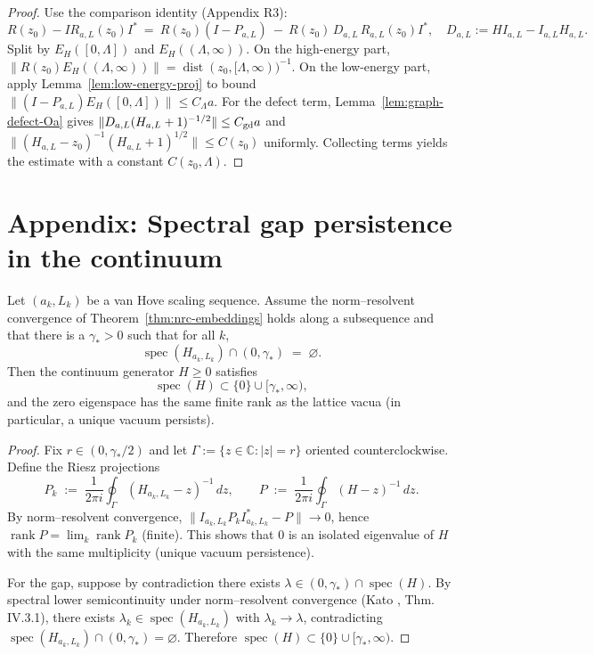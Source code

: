 \documentclass[11pt]{amsart}
\begin{document}
\begin{proof}
Use the comparison identity (Appendix R3):
\[
  R(z_0)-I R_{a,L}(z_0) I^*\ =\ R(z_0)(I-P_{a,L})\ -\ R(z_0)\,D_{a,L}\,R_{a,L}(z_0) I^*,\quad D_{a,L}:=H I_{a,L}-I_{a,L}H_{a,L}.
\]
Split by $E_H([0,\Lambda])$ and $E_H((\Lambda,\infty))$. On the high-energy part, $\|R(z_0) E_H((\Lambda,\infty))\|=\operatorname{dist}(z_0,[\Lambda,\infty))^{-1}$. On the low-energy part, apply Lemma~\ref{lem:low-energy-proj} to bound $\|(I-P_{a,L})E_H([0,\Lambda])\|\le C_\Lambda a$. For the defect term, Lemma~\ref{lem:graph-defect-Oa} gives $\|D_{a,L}(H_{a,L}+1)^{-1/2}\|\le C_{\rm gd} a$ and $\|(H_{a,L}-z_0)^{-1}(H_{a,L}+1)^{1/2}\|\le C(z_0)$ uniformly. Collecting terms yields the estimate with a constant $C(z_0,\Lambda)$.
\end{proof}

\medskip
\section{Appendix: Spectral gap persistence in the continuum}

\begin{theorem}\label{thm:gap-persist-cont}
Let $(a_k,L_k)$ be a van Hove scaling sequence. Assume the norm--resolvent convergence of Theorem~\ref{thm:nrc-embeddings} holds along a subsequence and that there is a $\gamma_*>0$ such that for all $k$,
\[
  \operatorname{spec}(H_{a_k,L_k})\cap(0,\gamma_*)\;=\;\varnothing.
\]
Then the continuum generator $H\ge 0$ satisfies
\[
  \operatorname{spec}(H)\subset \{0\}\cup[\gamma_*,\infty),
\]
and the zero eigenspace has the same finite rank as the lattice vacua (in particular, a unique vacuum persists).
\end{theorem}
\begin{proof}
Fix $r\in(0,\gamma_*/2)$ and let $\Gamma:=\{z\in\mathbb C:|z|=r\}$ oriented counterclockwise. Define the Riesz projections
\[
  P_k\;:=\;\frac{1}{2\pi i}\oint_\Gamma (H_{a_k,L_k}-z)^{-1}\,dz,\qquad
  P\;:=\;\frac{1}{2\pi i}\oint_\Gamma (H-z)^{-1}\,dz.
\]
By norm--resolvent convergence, $\|I_{a_k,L_k} P_k I_{a_k,L_k}^*-P\|\to 0$, hence $\operatorname{rank}P=\lim_k \operatorname{rank}P_k$ (finite). This shows that $0$ is an isolated eigenvalue of $H$ with the same multiplicity (unique vacuum persistence).

For the gap, suppose by contradiction there exists $\lambda\in (0,\gamma_*)\cap\operatorname{spec}(H)$. By spectral lower semicontinuity under norm--resolvent convergence (Kato \cite{Kato1995}, Thm. IV.3.1), there exists $\lambda_k\in \operatorname{spec}(H_{a_k,L_k})$ with $\lambda_k\to \lambda$, contradicting $\operatorname{spec}(H_{a_k,L_k})\cap(0,\gamma_*)=\varnothing$. Therefore $\operatorname{spec}(H)\subset \{0\}\cup[\gamma_*,\infty)$.
\end{proof}
\end{document}

